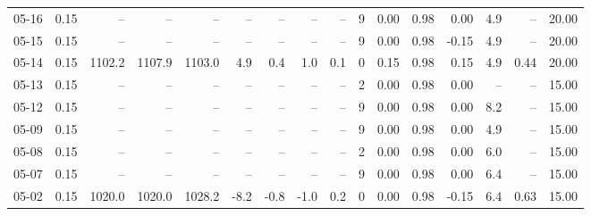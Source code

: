 \begin{threeparttable}
{\begin{tabular}{lrrrrrrrrrrrrrrr}
  05-16 &     0.15 &     -- &     -- &     -- &         -- &             -- &                       -- &                  -- &              9 &       0.00 &      0.98 &           0.00 &              4.9 &              -- &                  20.00 \\
  05-15 &     0.15 &     -- &     -- &     -- &         -- &             -- &                       -- &                  -- &              9 &       0.00 &      0.98 &          -0.15 &              4.9 &              -- &                  20.00 \\
  05-14 &     0.15 & 1102.2 & 1107.9 & 1103.0 &        4.9 &            0.4 &                      1.0 &                 0.1 &              0 &       0.15 &      0.98 &           0.15 &              4.9 &            0.44 &                  20.00 \\
  05-13 &     0.15 &     -- &     -- &     -- &         -- &             -- &                       -- &                  -- &              2 &       0.00 &      0.98 &           0.00 &               -- &              -- &                  15.00 \\
  05-12 &     0.15 &     -- &     -- &     -- &         -- &             -- &                       -- &                  -- &              9 &       0.00 &      0.98 &           0.00 &              8.2 &              -- &                  15.00 \\
  05-09 &     0.15 &     -- &     -- &     -- &         -- &             -- &                       -- &                  -- &              9 &       0.00 &      0.98 &           0.00 &              4.9 &              -- &                  15.00 \\
  05-08 &     0.15 &     -- &     -- &     -- &         -- &             -- &                       -- &                  -- &              2 &       0.00 &      0.98 &           0.00 &              6.0 &              -- &                  15.00 \\
  05-07 &     0.15 &     -- &     -- &     -- &         -- &             -- &                       -- &                  -- &              9 &       0.00 &      0.98 &           0.00 &              6.4 &              -- &                  15.00 \\
  05-02 &     0.15 & 1020.0 & 1020.0 & 1028.2 &       -8.2 &           -0.8 &                     -1.0 &                 0.2 &              0 &       0.00 &      0.98 &          -0.15 &              6.4 &            0.63 &                  15.00 \\

\end{tabular}}
\end{threeparttable}
